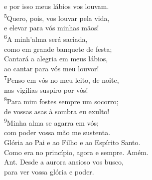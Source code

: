 \documentclass{book}
\begin{document}
\begin{center}
    e por isso meus lábios vos louvam.
    \vspace{.2cm} \\
    \textsuperscript{\underline{\hspace{.06in}}\textcolor{VioletRed2}{5}}Quero, pois, vos louvar pela vida, \textsuperscript{\gresixstar{}} \\
    e elevar para vós minhas mãos! \\
    \textsuperscript{\underline{\hspace{.06in}}\textcolor{VioletRed2}{6}}A minh'alma será saciada, \textsuperscript{\gresixstar{}} \\
    como em grande banquete de festa; \\
    \textsuperscript{\underline{\hspace{.06in}}} Cantará a alegria em meus lábios, \textsuperscript{\gresixstar{}} \\
    ao cantar para vós meu louvor!
    \vspace{.2cm} \\
    \textsuperscript{\underline{\hspace{.06in}}\textcolor{VioletRed2}{7}}Penso em vós no meu leito, de noite, \\
    nas vigílias suspiro por vós! \\
    \textsuperscript{\underline{\hspace{.06in}}\textcolor{VioletRed2}{8}}Para mim fostes sempre um socorro; \textsuperscript{\gresixstar{}} \\
    de vossas asas à sombra eu exulto! \\
    \textsuperscript{\underline{\hspace{.06in}}\textcolor{VioletRed2}{9}}Minha alma se agarra em vós; \textsuperscript{\gresixstar{}} \\
    com poder vossa mão me sustenta.
    \vspace{.2cm} \\
    \textsuperscript{\underline{\hspace{.06in}}} Glória ao Pai e ao Filho e ao Espírito Santo.\ \textsuperscript{\gresixstar{}} \\
    Como era no princípio, agora e sempre. Amém.
    \vspace{.2cm} \\
    \textcolor{VioletRed2}{Ant.} Desde a aurora ansioso vos busco, \\
    para ver vossa glória e poder.
    \vspace{.2cm} \\

\end{center}
\end{document}
